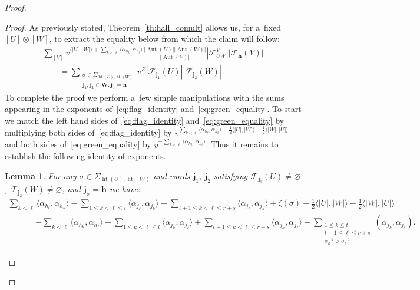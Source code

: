 \documentclass[pdftex]{sigma}
\numberwithin{equation}{section}
\newtheorem{Lemma}[Theorem]{Lemma}
\begin{document}
\begin{proof}
\begin{proof}
As previously stated, Theorem~\ref{th:hall_comult} allows us, for a~f\/ixed $[U]\otimes[W]$, to extract the equality below
from which the claim will follow:
\begin{gather}
\sum\limits_{[V]}v^{\langle|U|,|W|\rangle+\sum\limits_{k<\ell}\langle\alpha_{h_k},\alpha_{h_\ell}\rangle}
\frac{|\operatorname{Aut}(U)||\operatorname{Aut}(W)|}{|\operatorname{Aut}(V)|}|\mathcal{F}^V_{UW}||\mathcal{F}_\mathbf{h}(V)|
\nonumber
\\
\qquad
=\sum\limits_{\substack{\sigma\in\Sigma_{\operatorname{ht}(U),\operatorname{ht}(W)}\\
\mathbf{j}_1,\mathbf{j}_2\in\mathbf{W}: \mathbf{j}_\sigma=\mathbf{h}}}
v^E|\mathcal{F}_{\mathbf{j}_1}(U)||\mathcal{F}_{\mathbf{j}_2}(W)|.
\label{eq:green_equality}
\end{gather}
To complete the proof we perform a~few simple manipulations with the sums appearing in the exponents
of~\eqref{eq:flag_identity} and~\eqref{eq:green_equality}.
To start we match the left hand sides of~\eqref{eq:flag_identity} and~\eqref{eq:green_equality} by multiplying both
sides of~\eqref{eq:flag_identity} by $v^{\sum\limits_{k<\ell}\langle
\alpha_{h_\ell},\alpha_{h_k}\rangle-\frac{1}{2}\langle |U|,|W|\rangle-\frac{1}{2}\langle |W|,|U|\rangle}$ and both sides
of~\eqref{eq:green_equality} by $v^{-\sum\limits_{k<\ell}\langle \alpha_{h_k},\alpha_{h_\ell}\rangle}$.
Thus it remains to establish the following identity of exponents.
\begin{Lemma}
\label{lem:exp_equality}
For any $\sigma\in\Sigma_{\operatorname{ht}(U),\operatorname{ht}(W)}$ and words $\mathbf{j}_1$, $\mathbf{j}_2$ satisfying
$\mathcal{F}_{\mathbf{j}_1}(U)\ne\varnothing$, $\mathcal{F}_{\mathbf{j}_2}(W)\ne\varnothing$, and
$\mathbf{j}_\sigma=\mathbf{h}$ we have:
\begin{gather}
\nonumber
\sum\limits_{k<\ell}\langle \alpha_{h_\ell},\alpha_{h_k}\rangle
-\!\sum\limits_{1\le k<\ell\le t}\!\!\langle\alpha_{j_\ell},\alpha_{j_k}\rangle
-\!\sum\limits_{t+1\le k<\ell\le r+s}\!\!\langle\alpha_{j_\ell},\alpha_{j_k}\rangle
+\zeta(\sigma)-\frac{1}{2}\langle |U|,|W|\rangle-\frac{1}{2}\langle|W|,|U|\rangle
\nonumber
\\
\qquad
=-\sum\limits_{k<\ell}\langle \alpha_{h_k},\alpha_{h_\ell}\rangle+\sum\limits_{1\le k<\ell\le t}\!\!\langle\alpha_{j_k},\alpha_{j_\ell}\rangle
+\sum\limits_{t+1\le k<\ell\le r+s}\!\!\!\!\langle\alpha_{j_k},\alpha_{j_\ell}\rangle
+\!\!\!\sum\limits_{\substack{1\le k\le t\\t+1\le\ell\le r+s\\ \sigma_k^{-1}>\sigma_\ell^{-1}}}\!\!\!\!(\alpha_{j_k},\alpha_{j_\ell}). %
\label{eq:exp_equality}
\end{gather}
\end{Lemma}


\end{proof}
\end{proof}
\end{document}
